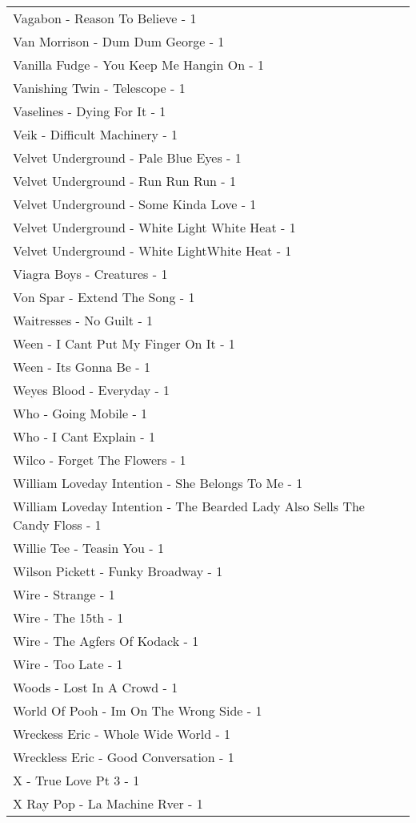 \documentclass[
]{article}
\begin{document}
\begin{longtable}{l}
Vagabon - Reason To Believe - 1 \\ 
Van Morrison - Dum Dum George - 1 \\ 
Vanilla Fudge - You Keep Me Hangin On - 1 \\ 
Vanishing Twin - Telescope - 1 \\ 
Vaselines - Dying For It - 1 \\ 
Veik - Difficult Machinery - 1 \\ 
Velvet Underground - Pale Blue Eyes - 1 \\ 
Velvet Underground - Run Run Run - 1 \\ 
Velvet Underground - Some Kinda Love - 1 \\ 
Velvet Underground - White Light White Heat - 1 \\ 
Velvet Underground - White LightWhite Heat - 1 \\ 
Viagra Boys - Creatures - 1 \\ 
Von Spar - Extend The Song - 1 \\ 
Waitresses - No Guilt - 1 \\ 
Ween - I Cant Put My Finger On It - 1 \\ 
Ween - Its Gonna Be - 1 \\ 
Weyes Blood - Everyday - 1 \\ 
Who - Going Mobile - 1 \\ 
Who - I Cant Explain - 1 \\ 
Wilco - Forget The Flowers - 1 \\ 
William Loveday Intention - She Belongs To Me - 1 \\ 
William Loveday Intention - The Bearded Lady Also Sells The Candy Floss - 1 \\ 
Willie Tee - Teasin You - 1 \\ 
Wilson Pickett - Funky Broadway - 1 \\ 
Wire - Strange - 1 \\ 
Wire - The 15th - 1 \\ 
Wire - The Agfers Of Kodack - 1 \\ 
Wire - Too Late - 1 \\ 
Woods - Lost In A Crowd - 1 \\ 
World Of Pooh - Im On The Wrong Side - 1 \\ 
Wreckess Eric - Whole Wide World - 1 \\ 
Wreckless Eric - Good Conversation - 1 \\ 
X - True Love Pt 3 - 1 \\ 
X Ray Pop - La Machine Rver - 1 \\ 

\end{longtable}
\end{document}

